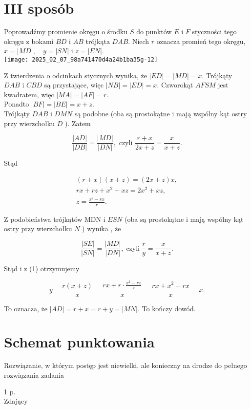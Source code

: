 \documentclass[10pt]{article}
\begin{document}
\section*{III sposób}
Poprowadźmy promienie okręgu o środku $S$ do punktów $E$ i $F$ styczności tego okręgu z bokami $B D$ i $A B$ trójkąta $D A B$. Niech $r$ oznacza promień tego okręgu, $x=|M D|, \quad y=|S N|$ i $z=|E N|$.\\
\texttt{[image: 2025\_02\_07\_98a741470d4a24b1ba35g-12]}

Z twierdzenia o odcinkach stycznych wynika, że $|E D|=|M D|=x$. Trójkąty $D A B$ i $C B D$ są przystające, więc $|N B|=|E D|=x$. Czworokąt $A F S M$ jest kwadratem, więc $|M A|=|A F|=r$.\\
Ponadto $|B F|=|B E|=x+z$.\\
Trójkąty $D A B$ i $D M N$ są podobne (oba są prostokątne i mają wspólny kąt ostry przy wierzchołku $D$ ). Zatem

$$
\frac{|A D|}{|D B|}=\frac{|M D|}{|D N|}, \text { czyli } \frac{r+x}{2 x+z}=\frac{x}{x+z} .
$$

Stąd

$$
\begin{gathered}
(r+x)(x+z)=(2 x+z) x, \\
r x+r z+x^{2}+x z=2 x^{2}+x z, \\
z=\frac{x^{2}-r x}{r} .
\end{gathered}
$$

Z podobieństwa trójkątów MDN i $E S N$ (oba są prostokątne i mają wspólny kąt ostry przy wierzchołku $N$ ) wynika , że

$$
\frac{|S E|}{|S N|}=\frac{|M D|}{|D N|}, \operatorname{czyli} \frac{r}{y}=\frac{x}{x+z} .
$$

Stąd i z (1) otrzymujemy

$$
y=\frac{r(x+z)}{x}=\frac{r x+r \cdot \frac{x^{2}-r x}{r}}{x}=\frac{r x+x^{2}-r x}{x}=x .
$$

To oznacza, że $|A D|=r+x=r+y=|M N|$. To kończy dowód.

\section*{Schemat punktowania}
Rozwiązanie, w którym postęp jest niewielki, ale konieczny na drodze do pełnego rozwiązania zadania

1 p.\\
Zdający
\end{document}
